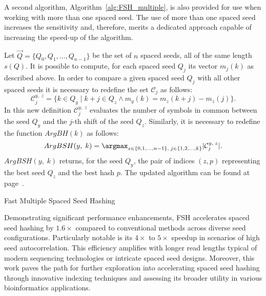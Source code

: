 A second algorithm, Algorithm~\ref{alg:FSH_multiple}, is also provided for use when working with more than one spaced seed. The use of more than one spaced seed increases the sensitivity \cite{leimeister2014fast} and, therefore, merits a dedicated approach capable of increasing the speed-up of the algorithm. 

Let $\vec{Q} = \{ Q_0, Q_1, \dots, Q_{n - 1} \}$ be the set of $n$ spaced seeds, all of the same length $s(Q)$. It is possible to compute, for each spaced seed $Q_j$ its vector $m_j(k)$ as described above. In order to compare a given spaced seed $Q_j$ with all other spaced seeds it is necessary to redefine the set $\mathcal{C}_j$ as follows: \[ \mathcal{C}_j^{y,\; z} = \{ k \in Q_y \; | \; k + j \in Q_z \wedge m_y(k) = m_z(k + j) - m_z(j) \}. \] In this new definition $\mathcal{C}_j^{y,\; z}$ evaluates the number of symbols in common between the seed $Q_y$ and the $j$-th shift of the seed $Q_z$. Similarly, it is necessary to redefine the function $ArgBH(k)$ as follows: \[ ArgBSH(y,\; k) = \argmax_{z \in \{ 0, 1, \dots, n - 1 \},\; j \in \{ 1, 2, \dots, k \}} |\mathcal{C}_j^{y,\; z}|. \] $ArgBSH(y,\; k)$ returns, for the seed $Q_y$, the pair of indices $(z, p)$ representing the best seed $Q_z$ and the best hash $p$. The updated algorithm can be found at page~\pageref{alg:FSH_multiple}.

\begin{algorithm}[!ht]
	\caption{Fast Multiple Spaced Seed Hashing}
	\label{alg:FSH_multiple}
\end{algorithm}

Demonstrating significant performance enhancements, \acs{FSH} accelerates spaced seed hashing by $1.6\times$ compared to conventional methods across diverse seed configurations. Particularly notable is its $4\times$ to $5\times$ speedup in scenarios of high seed autocorrelation. This efficiency amplifies with longer read lengths typical of modern sequencing technologies or intricate spaced seed designs. Moreover, this work paves the path for further exploration into accelerating spaced seed hashing through innovative indexing techniques and assessing its broader utility in various bioinformatics applications.
